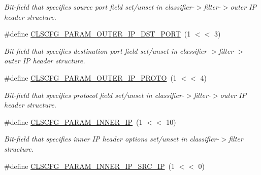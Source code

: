 \begin{DoxyCompactItemize}
\begin{DoxyCompactList}\small\item\em Bit-\/field that specifies source port field set/unset in classifier-\/$>$filter-\/$>$outer I\-P header structure. \end{DoxyCompactList}\item 
\hypertarget{group__FAPI__QOS__CLASS_gad605735a2ef44435aef61a57221ced3c}{\#define \hyperlink{group__FAPI__QOS__CLASS_gad605735a2ef44435aef61a57221ced3c}{C\-L\-S\-C\-F\-G\-\_\-\-P\-A\-R\-A\-M\-\_\-\-O\-U\-T\-E\-R\-\_\-\-I\-P\-\_\-\-D\-S\-T\-\_\-\-P\-O\-R\-T}~(1 $<$$<$ 3)}\label{group__FAPI__QOS__CLASS_gad605735a2ef44435aef61a57221ced3c}

\begin{DoxyCompactList}\small\item\em Bit-\/field that specifies destination port field set/unset in classifier-\/$>$filter-\/$>$outer I\-P header structure. \end{DoxyCompactList}\item 
\hypertarget{group__FAPI__QOS__CLASS_ga8b476d0bf1917ff8fbc6e13a43c38662}{\#define \hyperlink{group__FAPI__QOS__CLASS_ga8b476d0bf1917ff8fbc6e13a43c38662}{C\-L\-S\-C\-F\-G\-\_\-\-P\-A\-R\-A\-M\-\_\-\-O\-U\-T\-E\-R\-\_\-\-I\-P\-\_\-\-P\-R\-O\-T\-O}~(1 $<$$<$ 4)}\label{group__FAPI__QOS__CLASS_ga8b476d0bf1917ff8fbc6e13a43c38662}

\begin{DoxyCompactList}\small\item\em Bit-\/field that specifies protocol field set/unset in classifier-\/$>$filter-\/$>$outer I\-P header structure. \end{DoxyCompactList}\item 
\hypertarget{group__FAPI__QOS__CLASS_gad6d817b1390cdd0c968023a1e42e4dda}{\#define \hyperlink{group__FAPI__QOS__CLASS_gad6d817b1390cdd0c968023a1e42e4dda}{C\-L\-S\-C\-F\-G\-\_\-\-P\-A\-R\-A\-M\-\_\-\-I\-N\-N\-E\-R\-\_\-\-I\-P}~(1 $<$$<$ 10)}\label{group__FAPI__QOS__CLASS_gad6d817b1390cdd0c968023a1e42e4dda}

\begin{DoxyCompactList}\small\item\em Bit-\/field that specifies inner I\-P header options set/unset in classifier-\/$>$filter structure. \end{DoxyCompactList}\item 
\hypertarget{group__FAPI__QOS__CLASS_ga5fd6dd05766ea3c6ba0004e068533570}{\#define \hyperlink{group__FAPI__QOS__CLASS_ga5fd6dd05766ea3c6ba0004e068533570}{C\-L\-S\-C\-F\-G\-\_\-\-P\-A\-R\-A\-M\-\_\-\-I\-N\-N\-E\-R\-\_\-\-I\-P\-\_\-\-S\-R\-C\-\_\-\-I\-P}~(1 $<$$<$ 0)}\label{group__FAPI__QOS__CLASS_ga5fd6dd05766ea3c6ba0004e068533570}


\end{DoxyCompactItemize}

